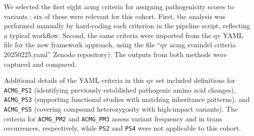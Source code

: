 We selected the first eight \ac{acmg} criteria for assigning pathogenicity scores to variants \cite{richards2015standards}; six of these were relevant for this cohort. First, the analysis was performed manually by hard-coding each criterion in the pipeline script, reflecting a typical workflow. Second, the same criteria were imported from the \ac{qv} YAML file for the new framework approach, using the file ``qv acmg svnindel criteria 20250225.yaml'' 
 Zenodo repository).
The outputs from both methods were captured and compared.

Additional details of the YAML criteria in this \ac{qv} set included definitions for \texttt{ACMG\_PS1} (identifying previously established pathogenic amino acid changes), \texttt{ACMG\_PS3} (supporting functional studies with matching inheritance patterns), and \texttt{ACMG\_PS5} (covering compound heterozygosity with high-impact variants). The criteria for \texttt{ACMG\_PM2} and \texttt{ACMG\_PM3} assess variant frequency and in trans occurrences, respectively, while \texttt{PS2} and \texttt{PS4} were not applicable to this cohort.

% 

%

